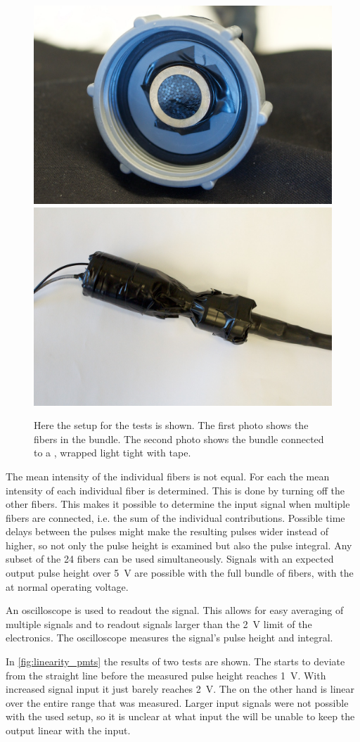 \begin{figure}
    \centering
    \includegraphics[width=0.45\linewidth]{plots/station/ARN_085351.jpg}
    \includegraphics[width=0.45\linewidth]{plots/station/ARN_085349.jpg}
    \caption{Here the setup for the \pmt tests is shown. The first photo shows the fibers in the bundle. The second photo shows the bundle connected to a \nikhef \pmt, wrapped light tight with tape.}
    \label{fig:pmt_test_setup}
\end{figure}

The mean intensity of the individual fibers is not equal. For each \pmt the mean intensity of each individual fiber is determined. This is done by turning off the other fibers. This makes it possible to determine the input signal when multiple fibers are connected, i.e. the sum of the individual contributions. Possible time delays between the pulses might make the resulting pulses wider instead of higher, so not only the pulse height is examined but also the pulse integral. Any subset of the 24 fibers can be used simultaneously. Signals with an expected \pmt output pulse height over \SI{5}{\volt} are possible with the full bundle of fibers, with the \pmt at normal operating voltage.

An oscilloscope is used to readout the \pmt signal. This allows for easy averaging of multiple signals and to readout signals larger than the \SI{2}{\volt} limit of the \hisparc electronics. The oscilloscope measures the signal's pulse height and integral.

In \cref{fig:linearity_pmts} the results of two \pmt tests are shown. The \senstech \pmt starts to deviate from the straight line before the measured pulse height reaches \SI{1}{\volt}. With increased signal input it just barely reaches \SI{2}{\volt}. The \nikhef \pmt on the other hand is linear over the entire range that was measured. Larger input signals were not possible with the used setup, so it is unclear at what input the \nikhef \pmt will be unable to keep the output linear with the input.

